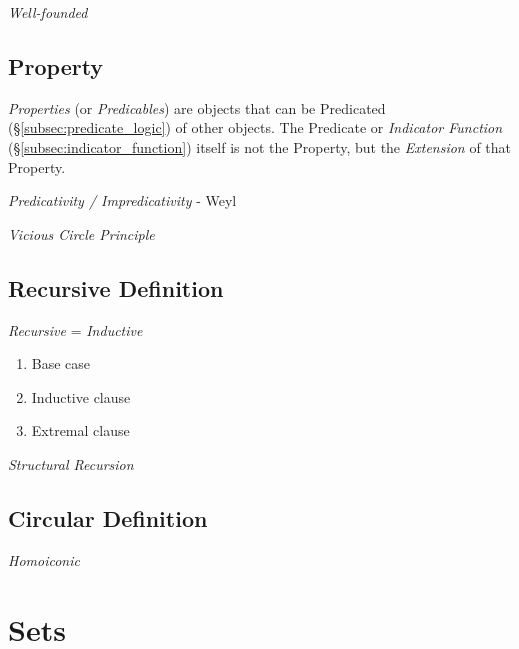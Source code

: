 \documentclass{article}
\begin{document}
\emph{Well-founded}

\subsection{Property}\label{subsec:set_property}

\emph{Properties} (or \emph{Predicables}) are objects that can be
Predicated (\S\ref{subsec:predicate_logic}) of other objects. The
Predicate or \emph{Indicator Function}
(\S\ref{subsec:indicator_function}) itself is not the Property, but
the \emph{Extension} of that Property.

\emph{Predicativity / Impredicativity} - Weyl

\emph{Vicious Circle Principle}

\subsection{Recursive Definition}\label{subsec:recursive_definition}

\emph{Recursive} = \emph{Inductive}

\begin{enumerate}
    \item Base case
    \item Inductive clause
    \item Extremal clause
\end{enumerate}

\emph{Structural Recursion}



\subsection{Circular Definition}\label{subsec:circular_definition}

\emph{Homoiconic}



\section{Sets}\label{sec:sets}
\end{document}
